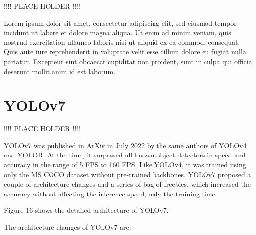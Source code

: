 \documentclass{article}
\begin{document}
!!!! PLACE HOLDER !!!!

Lorem ipsum dolor sit amet, consectetur adipiscing elit, sed eiusmod tempor incidunt ut labore et dolore magna aliqua. Ut enim ad minim veniam, quis nostrud exercitation ullamco laboris nisi ut aliquid ex ea commodi consequat. Quis aute iure reprehenderit in voluptate velit esse cillum dolore eu fugiat nulla pariatur. Excepteur sint obcaecat cupiditat non proident, sunt in culpa qui officia deserunt mollit anim id est laborum.



\section{YOLOv7}

!!!! PLACE HOLDER !!!!


YOLOv7 \cite{wang2023yolov7} was published in ArXiv in July 2022 by the same authors of YOLOv4 and YOLOR. At the time, it surpassed all known object detectors in speed and accuracy in the range of 5 FPS to 160 FPS. Like YOLOv4, it was trained using only the MS COCO dataset without pre-trained backbones. YOLOv7 proposed a couple of architecture changes and a series of bag-of-freebies, which increased the accuracy without affecting the inference speed, only the training time.

Figure 16 shows the detailed architecture of YOLOv7.

The architecture changes of YOLOv7 are:
\end{document}
